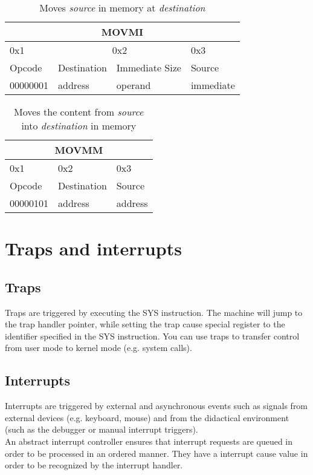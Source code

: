 \documentclass{article}
\begin{document}
\begin{table}[h!]
  \centering
  \begin{tabular} { | p{2cm} | | p{2cm} | p{} | | p{2cm} |}
    \hline
    \multicolumn{4}{|c|}{MOVMI}\\
    \hline
    0x1 & \multicolumn{2}{|c|}{0x2} & 0x3\\
    \hline
    Opcode & Destination & Immediate Size & Source\\
    00000001 & address & operand & immediate\\
    \hline
  \end{tabular}
  \caption{Moves \textit{source} in memory at \textit{destination}}
\end{table}

\begin{table}[h!]
  \centering
  \begin{tabular} { | p{2cm} | | p{2cm} | p{2cm} |}
    \hline
    \multicolumn{3}{|c|}{MOVMM}\\
    \hline
    0x1 & 0x2 & 0x3\\
    \hline
    Opcode & Destination & Source\\
    00000101 & address & address\\
    \hline
  \end{tabular}
  \caption{Moves the content from \textit{source} into \textit{destination} in memory}
\end{table}

\section{Traps and interrupts}
\subsection{Traps}
Traps are triggered by executing the SYS instruction. The machine will jump to the trap handler pointer, while setting the trap cause special register to the identifier specified in the SYS instruction. You can use traps to transfer control from user mode to kernel mode (e.g. system calls).
\subsection{Interrupts}
Interrupts are triggered by external and asynchronous events such as signals from external devices (e.g. keyboard, mouse) and from the didactical environment (such as the debugger or manual interrupt triggers). \\An abstract interrupt controller ensures that interrupt requests are queued in order to be processed in an ordered manner. They have a interrupt cause value in order to be recognized by the interrupt handler.
\end{document}
